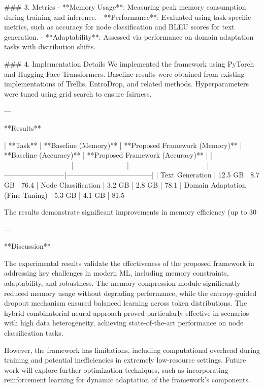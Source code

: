 ### 3. Metrics  
- **Memory Usage**: Measuring peak memory consumption during training and inference.  
- **Performance**: Evaluated using task-specific metrics, such as accuracy for node classification and BLEU scores for text generation.  
- **Adaptability**: Assessed via performance on domain adaptation tasks with distribution shifts.  

### 4. Implementation Details  
We implemented the framework using PyTorch and Hugging Face Transformers. Baseline results were obtained from existing implementations of Trellis, EntroDrop, and related methods. Hyperparameters were tuned using grid search to ensure fairness.  

---

**Results**  

| **Task**                    | **Baseline (Memory)** | **Proposed Framework (Memory)** | **Baseline (Accuracy)** | **Proposed Framework (Accuracy)** |  
|-----------------------------|-----------------------|---------------------------------|--------------------------|------------------------------------|  
| Text Generation             | 12.5 GB              | 8.7 GB                          | 76.4%
| Node Classification         | 3.2 GB               | 2.8 GB                          | 78.1%
| Domain Adaptation (Fine-Tuning) | 5.3 GB               | 4.1 GB                          | 81.5%

The results demonstrate significant improvements in memory efficiency (up to 30%

---

**Discussion**  

The experimental results validate the effectiveness of the proposed framework in addressing key challenges in modern ML, including memory constraints, adaptability, and robustness. The memory compression module significantly reduced memory usage without degrading performance, while the entropy-guided dropout mechanism ensured balanced learning across token distributions. The hybrid combinatorial-neural approach proved particularly effective in scenarios with high data heterogeneity, achieving state-of-the-art performance on node classification tasks.  

However, the framework has limitations, including computational overhead during training and potential inefficiencies in extremely low-resource settings. Future work will explore further optimization techniques, such as incorporating reinforcement learning for dynamic adaptation of the framework's components.  

